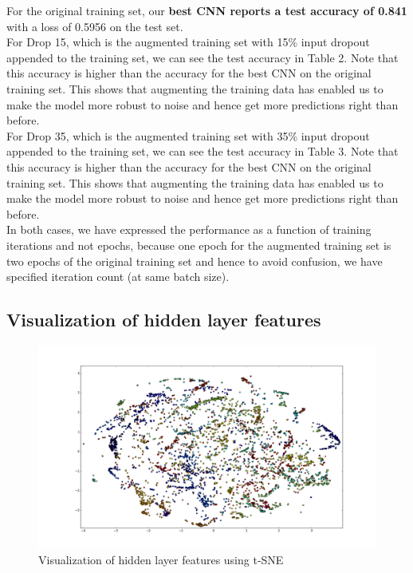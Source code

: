 \documentclass[10pt,twocolumn,letterpaper]{article}
\begin{document}
For the original training set, our \textbf{best CNN reports a test accuracy of 0.841} with a loss of 0.5956 on the test set.\\
For Drop 15, which is the augmented training set with 15\% input dropout appended to the training set, we can see the test accuracy in Table 2. Note that this accuracy is higher than the accuracy for the best CNN on the original training set. This shows that augmenting the training data has enabled us to make the model more robust to noise and hence get more predictions right than before.\\
For Drop 35, which is the augmented training set with 35\% input dropout appended to the training set, we can see the test accuracy in Table 3. Note that this accuracy is higher than the accuracy for the best CNN on the original training set. This shows that augmenting the training data has enabled us to make the model more robust to noise and hence get more predictions right than before.\\
In both cases, we have expressed the performance as a function of training iterations and not epochs, because one epoch for the augmented training set is two epochs of the original training set and hence to avoid confusion, we have specified iteration count (at same batch size).

\subsection{Visualization of hidden layer features}

\begin{figure}
\begin{center}
\includegraphics[width=\linewidth]{zoom_out.png}
\end{center}
   \caption{Visualization of hidden layer features using t-SNE}
\label{Visualization}
\end{figure}
\end{document}
